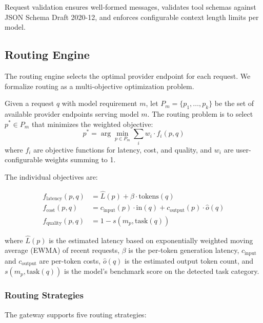 Request validation ensures well-formed messages, validates tool schemas against JSON Schema Draft 2020-12, and enforces configurable context length limits per model.

\subsection{Routing Engine}
\label{sec:routing}

The routing engine selects the optimal provider endpoint for each request. We formalize routing as a multi-objective optimization problem.

\begin{definition}
Given a request $q$ with model requirement $m$, let $P_m = \{p_1, \ldots, p_k\}$ be the set of available provider endpoints serving model $m$. The routing problem is to select $p^* \in P_m$ that minimizes the weighted objective:
\begin{equation}
p^* = \arg\min_{p \in P_m} \sum_{i} w_i \cdot f_i(p, q)
\end{equation}
where $f_i$ are objective functions for latency, cost, and quality, and $w_i$ are user-configurable weights summing to 1.
\end{definition}

The individual objectives are:

\begin{align}
f_{\text{latency}}(p, q) &= \hat{L}(p) + \beta \cdot \text{tokens}(q) \label{eq:latency} \\
f_{\text{cost}}(p, q) &= c_{\text{input}}(p) \cdot \text{in}(q) + c_{\text{output}}(p) \cdot \hat{o}(q) \label{eq:cost} \\
f_{\text{quality}}(p, q) &= 1 - s(m_p, \text{task}(q)) \label{eq:quality}
\end{align}

where $\hat{L}(p)$ is the estimated latency based on exponentially weighted moving average (EWMA) of recent requests, $\beta$ is the per-token generation latency, $c_{\text{input}}$ and $c_{\text{output}}$ are per-token costs, $\hat{o}(q)$ is the estimated output token count, and $s(m_p, \text{task}(q))$ is the model's benchmark score on the detected task category.

\subsubsection{Routing Strategies}

The gateway supports five routing strategies:

